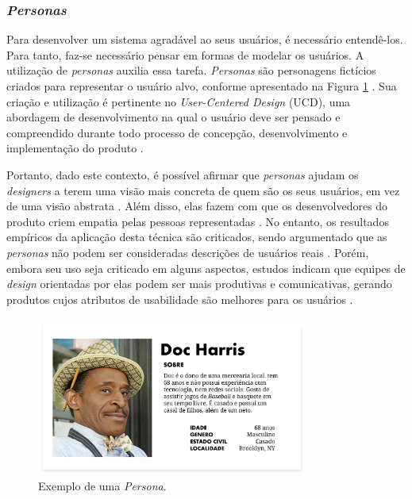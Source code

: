 \documentclass[12pt]{article}
\begin{document}
\subsubsection{\emph{Personas}}
Para desenvolver um sistema agradável ao seus usuários, é necessário entendê-los. Para tanto, faz-se necessário pensar em formas de modelar os usuários. A utilização de \emph{personas} auxilia essa tarefa. \emph{Personas} são personagens fictícios criados para representar o usuário alvo, conforme apresentado na Figura \ref{fig:persona} \cite{Book_Universal_Principles_Design}. Sua criação e utilização é pertinente no \emph{User-Centered Design} (UCD), uma abordagem de desenvolvimento na qual o usuário deve ser pensado e compreendido durante todo processo de concepção, desenvolvimento e implementação do produto \cite{5529821}.  
\par Portanto, dado este contexto, é possível afirmar que \emph{personas} ajudam os \emph{designers} a terem uma visão mais concreta de quem são os seus usuários, em vez de uma visão abstrata \cite{10.5555/1076976}. Além disso, elas fazem com que os desenvolvedores do produto criem empatia pelas pessoas representadas \cite{10.5555/553473}. No entanto, os resultados empíricos da aplicação desta técnica são criticados, sendo argumentado que as \emph{personas} não podem ser consideradas descrições de usuários reais \cite{10.1177/154193120605000503}. Porém, embora seu uso seja criticado em alguns aspectos, estudos indicam que equipes de \emph{design} orientadas por elas podem ser mais produtivas e comunicativas, gerando produtos cujos atributos de usabilidade são melhores para os usuários \cite{long_study}.

\begin{figure}[H]
    \centering
    \includegraphics[width=0.795\textwidth]{images/persona.png}
    \caption{Exemplo de uma \emph{Persona}.}
    \label{fig:persona}
\end{figure}
\end{document}
